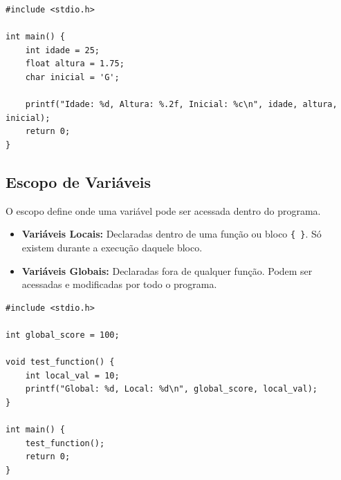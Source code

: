 \documentclass{article}
\begin{document}
\begin{lstlisting}[caption={Exemplo de declaracao de variaveis}]
#include <stdio.h>

int main() {
    int idade = 25;           
    float altura = 1.75;      
    char inicial = 'G';       
    
    printf("Idade: %d, Altura: %.2f, Inicial: %c\n", idade, altura, inicial);
    return 0;
}
\end{lstlisting}

\subsection{Escopo de Variáveis}

O escopo define onde uma variável pode ser acessada dentro do programa.

\begin{itemize}
    \item \textbf{Variáveis Locais:} Declaradas dentro de uma função ou bloco \texttt{\{ \}}. Só existem durante a execução daquele bloco.
    \item \textbf{Variáveis Globais:} Declaradas fora de qualquer função. Podem ser acessadas e modificadas por todo o programa.
\end{itemize}

\begin{lstlisting}[caption={Exemplo de Escopo}]
#include <stdio.h>

int global_score = 100;

void test_function() {
    int local_val = 10;
    printf("Global: %d, Local: %d\n", global_score, local_val);
}

int main() {
    test_function();
    return 0;
}
\end{lstlisting}
\end{document}
